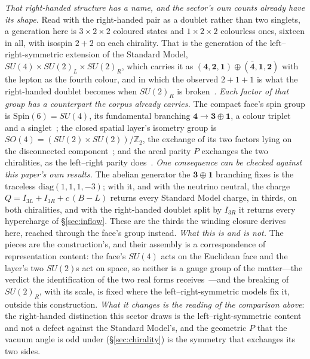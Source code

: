 \documentclass[11pt]{article}
\begin{document}
\emph{That right-handed structure has a name, and the sector's own counts already have its shape.} Read with the right-handed pair as a doublet rather than two singlets, a generation here is $3\times2\times2$ coloured states and $1\times2\times2$ colourless ones, sixteen in all, with isospin $2{+}2$ on each chirality. That is the generation of the left--right-symmetric extension of the Standard Model, $SU(4)\times SU(2)_{L}\times SU(2)_{R}$, which carries it as $(\mathbf4,\mathbf2,\mathbf1)\oplus(\bar{\mathbf4},\mathbf1,\mathbf2)$ with the lepton as the fourth colour, and in which the observed $2{+}1{+}1$ is what the right-handed doublet becomes when $SU(2)_{R}$ is broken~\cite{PatiSalam1974,MohapatraPati1975}. \emph{Each factor of that group has a counterpart the corpus already carries.} The compact face's spin group is $\mathrm{Spin}(6)=SU(4)$, its fundamental branching $\mathbf4\to\mathbf3\oplus\mathbf1$, a colour triplet and a singlet~\cite{JanzenBoundary}; the closed spatial layer's isometry group is $SO(4)=(SU(2)\times SU(2))/\mathbb{Z}_{2}$, the exchange of its two factors lying on the disconnected component~\cite{JanzenCanonicalTime}; and the areal parity $P$ exchanges the two chiralities, as the left--right parity does~\cite{JanzenBoundary}. \emph{One consequence can be checked against this paper's own results.} The abelian generator the $\mathbf3\oplus\mathbf1$ branching fixes is the traceless $\mathrm{diag}(1,1,1,-3)$; with it, and with the neutrino neutral, the charge $Q=I_{3L}+I_{3R}+c\,(B{-}L)$ returns every Standard Model charge, in thirds, on both chiralities, and with the right-handed doublet split by $I_{3R}$ it returns every hypercharge of \S\ref{sec:inflow}. These are the thirds the winding closure derives here, reached through the face's group instead. \emph{What this is and is not.} The pieces are the construction's, and their assembly is a correspondence of representation content: the face's $SU(4)$ acts on the Euclidean face and the layer's two $SU(2)$s act on space, so neither is a gauge group of the matter---the verdict the identification of the two real forms receives~\cite{JanzenBoundary}---and the breaking of $SU(2)_{R}$, with its scale, is fixed where the left--right-symmetric models fix it, outside this construction. \emph{What it changes is the reading of the comparison above}: the right-handed distinction this sector draws is the left--right-symmetric content and not a defect against the Standard Model's, and the geometric $P$ that the vacuum angle is odd under (\S\ref{sec:chirality}) is the symmetry that exchanges its two sides.
\end{document}
